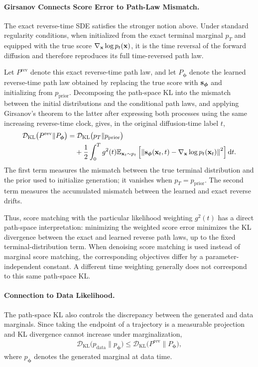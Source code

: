 \paragraph{Girsanov Connects Score Error to Path-Law Mismatch.}
The exact reverse-time SDE satisfies the stronger notion above. Under
standard regularity conditions, when initialized from the exact terminal
marginal $p_T$ and equipped with the true score
$\nabla_{{\mathbf{x}}}\log p_t({\mathbf{x}})$, it is the time reversal of the forward
diffusion and therefore reproduces its full time-reversed path law.

Let $P^{\mathrm{rev}}$ denote this exact reverse-time path law, and let
$P_{\bm{\phi}}$ denote the learned reverse-time path law obtained by
replacing the true score with ${\mathbf{s}}_{\bm{\phi}}$ and initializing from
$p_{\mathrm{prior}}$. Decomposing the path-space KL into the mismatch between the initial
distributions and the conditional path laws, and applying Girsanov's
theorem to the latter after expressing both processes using the same
increasing reverse-time clock, gives, in the original diffusion-time
label $t$,
\begin{align}\label{eq:girsanov-KL}
\begin{aligned}
\mathcal{D}_{\mathrm{KL}}
\bigl(P^{\mathrm{rev}}\|P_{\bm{\phi}}\bigr)
=
&\;
\mathcal{D}_{\mathrm{KL}}
\bigl(p_T\|p_{\mathrm{prior}}\bigr)
\\
&+
\frac{1}{2}
\int_0^T
g^2(t)
\mathbb{E}_{{\mathbf{x}}_t\sim p_t}
\left[
\left\|
{\mathbf{s}}_{\bm{\phi}}({\mathbf{x}}_t,t)
-
\nabla_{{\mathbf{x}}}\log p_t({\mathbf{x}}_t)
\right\|^2
\right]
\mathop{}\!\mathrm{d} t .
\end{aligned}
\end{align}
The first term measures the mismatch between the true terminal distribution
and the prior used to initialize generation; it vanishes when
$p_T=p_{\mathrm{prior}}$. The second term measures the accumulated mismatch
between the learned and exact reverse drifts.

Thus, score matching with the particular likelihood weighting $g^2(t)$
has a direct path-space interpretation: minimizing the weighted score error
minimizes the KL divergence between the exact and learned reverse path laws,
up to the fixed terminal-distribution term. When denoising score matching is
used instead of marginal score matching, the corresponding objectives differ
by a parameter-independent constant. A different time weighting generally
does not correspond to this same path-space KL.

\paragraph{Connection to Data Likelihood.}
The path-space KL also controls the discrepancy between the generated and
data marginals. Since taking the endpoint of a trajectory is a measurable
projection and KL divergence cannot increase under marginalization,
\begin{align}\label{eq:girsanov-likelihood}
\mathcal{D}_{\mathrm{KL}}
\bigl(p_{\mathrm{data}}\|p_{\bm{\phi}}\bigr)
\leq
\mathcal{D}_{\mathrm{KL}}
\bigl(P^{\mathrm{rev}}\|P_{\bm{\phi}}\bigr),
\end{align}
where $p_{\bm{\phi}}$ denotes the generated marginal at data time.

